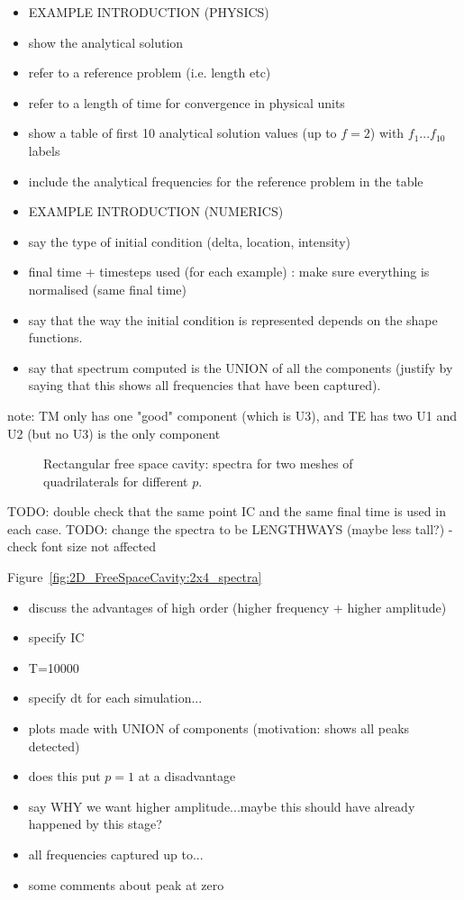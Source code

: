 \begin{itemize}
\item EXAMPLE INTRODUCTION (PHYSICS)
\item show the analytical solution
\item refer to a reference problem (i.e. length etc)
\item refer to a length of time for convergence in physical units
\item show a table of first 10 analytical solution values (up to $f=2$) with $f_1...f_10$ labels
\item include the analytical frequencies for the reference problem in the table
\item EXAMPLE INTRODUCTION (NUMERICS)
\item say the type of initial condition (delta, location, intensity)
\item final time + timesteps used (for each example) : make sure everything is
  normalised (same final time)
\item say that the way the initial condition is represented depends on the shape functions.
\item say that spectrum computed is the UNION of all the components (justify by
  saying that this shows all frequencies that have been captured).
\end{itemize}

note: TM only has one "good" component (which is U3), and TE has two U1 and U2 (but no U3) is the only component 
\begin{figure}[!ht]
	\centering
  	\caption{Rectangular free space cavity: spectra for two meshes of quadrilaterals for different $p$.}
\end{figure}
TODO: double check that the same point IC and the same final time is used in each case.
TODO: change the spectra to be LENGTHWAYS (maybe less tall?) - check font size
not affected

\item Figure~\ref{fig:2D_FreeSpaceCavity:2x4_spectra}
\begin{itemize}
\item discuss the advantages of high order (higher frequency + higher amplitude)
\item specify IC
\item T=10000
\item specify dt for each simulation...
\item plots made with UNION of components (motivation: shows all peaks detected)
\item does this put $p=1$ at a disadvantage
\item say WHY we want higher amplitude...maybe this should have already happened by this stage?
\item all frequencies captured up to...
\item some comments about peak at zero
\end{itemize}

